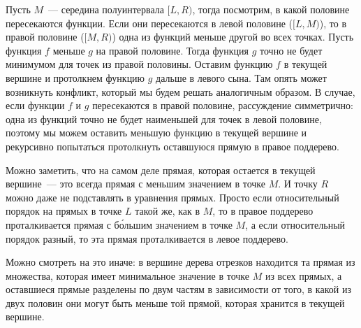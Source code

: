 Пусть $M$~--- середина полуинтервала $[L, R)$, тогда посмотрим, в какой половине пересекаются функции. Если они пересекаются в левой половине ($[L, M)$), то в правой половине ($[M, R)$) одна из функций меньше другой во всех точках. Пусть функция $f$ меньше $g$ на правой половине. Тогда функция $g$ точно не будет минимумом для точек из правой половины. Оставим функцию $f$ в текущей вершине и протолкнем функцию $g$ дальше в левого сына. Там опять может возникнуть конфликт, который мы будем решать аналогичным образом. В случае, если функции $f$ и $g$ пересекаются в правой половине, рассуждение симметрично: одна из функций точно не будет наименьшей для точек в левой половине, поэтому мы можем оставить меньшую функцию в текущей вершине и рекурсивно попытаться протолкнуть оставшуюся прямую в правое поддерево.



Можно заметить, что на самом деле прямая, которая остается в текущей вершине~--- это всегда прямая с меньшим значением в точке $M$. И точку $R$ можно даже не подставлять в уравнения прямых. Просто если относительный порядок на прямых в точке $L$ такой же, как в $M$, то в правое поддерево проталкивается прямая с б\'{о}льшим значением в точке $M$, а если относительный порядок разный, то эта прямая проталкивается в левое поддерево.

Можно смотреть на это иначе: в вершине дерева отрезков находится та прямая из множества, которая имеет минимальное значение в точке $M$ из всех прямых, а оставшиеся прямые разделены по двум частям в зависимости от того, в какой из двух половин они могут быть меньше той прямой, которая хранится в текущей вершине.

